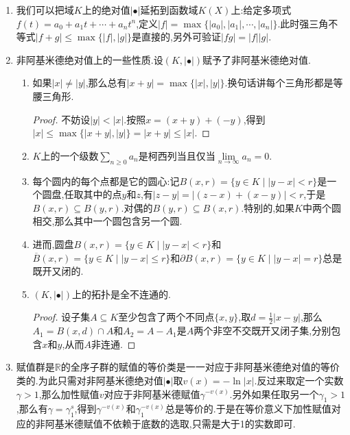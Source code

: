 \begin{enumerate}
\begin{proof}
		首先如果$|\bullet|$是非阿基米德的,那么有$|m|=|1+1+\cdots+1|\le|1|=1$.反过来,如果存在正整数$N$使得$|m1|\le N$.那么得到$|x+y|^n\le\sum_r|C_n^r||x|^r|y|^{n-r}$其中$|x| $和$|y|$都可以放缩到$\max\{|x|,|y|\}$,而$C_n^r$是整数,于是赋值放缩到条件要求的$N$.于是得到$|x+y|\le N^{1/n}(n+1)^{1/n}\max\{|x|,|y|\}$. 让$n\to+\infty$,得到这个系数趋于1,于是得到$|x+y|\le\max\{|x|,|y|\}$.由此得到赋值是非阿基米德的.
	\end{proof}
    \item 我们可以把域$K$上的绝对值$|\bullet|$延拓到函数域$K(X)$上:给定多项式$f(t)=a_0+a_1t+\cdots+a_nt^n$,定义$|f|=\max\{|a_0|,|a_1|,\cdots,|a_n|\}$.此时强三角不等式$|f+g|\le\max\{|f|,|g|\}$是直接的,另外可验证$|fg|=|f||g|$.
    \item 非阿基米德绝对值上的一些性质.设$(K,|\bullet|)$赋予了非阿基米德绝对值.
    \begin{enumerate}[(1)]
    	\item 如果$|x|\not=|y|$,那么总有$|x+y|=\max\{|x|,|y|\}$.换句话讲每个三角形都是等腰三角形.
    	\begin{proof}
    		
    		不妨设$|y|<|x|$.按照$x=(x+y)+(-y)$,得到$|x|\le\max\{|x+y|,|y|\}=|x+y|\le|x|$.
    	\end{proof}
    	\item $K$上的一个级数$\sum_{n\ge0}a_n$是柯西列当且仅当$\lim\limits_{n\to\infty}a_n=0$.
    	\item 每个圆内的每个点都是它的圆心:记$B(x,r)=\{y\in K\mid |y-x|<r\}$是一个圆盘,任取其中的点$y$和$z$,有$|z-y|=|(z-x)+(x-y)|<r$,于是$B(x,r)\subseteq B(y,r)$.对偶的$B(y,r)\subseteq B(x,r)$.特别的,如果$K$中两个圆相交,那么其中一个圆包含另一个圆.
    	\item 进而,圆盘$B(x,r)=\{y\in K\mid |y-x|<r\}$和$\overline{B}(x,r)=\{y\in K\mid |y-x|\le r\}$和$\partial B(x,r)=\{y\in K\mid |y-x|=r\}$总是既开又闭的.
    	\item $(K,|\bullet|)$上的拓扑是全不连通的.
    	\begin{proof}
    		
    		设子集$A\subseteq K$至少包含了两个不同点$\{x,y\}$,取$d=\frac{1}{2}|x-y|$,那么$A_1=B(x,d)\cap A$和$A_2=A-A_1$是$A$两个非空不交既开又闭子集,分别包含$x$和$y$,从而$A$非连通.
    	\end{proof}
    \end{enumerate}
    \item 赋值群是$\mathbb{R}$的全序子群的赋值的等价类是一一对应于非阿基米德绝对值的等价类的.为此只需对非阿基米德绝对值$|\bullet|$取$v(x)=-\ln|x|$.反过来取定一个实数$\gamma>1$,那么加性赋值$v$对应于非阿基米德赋值$\gamma^{-v(x)}$.另外如果任取另一个$\gamma_1>1$,那么有$\gamma=\gamma_1^s$,得到$\gamma^{-v(x)}$和$\gamma_1^{-v(x)}$总是等价的.于是在等价意义下加性赋值对应的非阿基米德赋值不依赖于底数的选取,只需是大于1的实数即可.
\end{enumerate}




